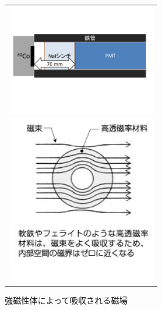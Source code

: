 \begin{figure}[tbp]
  \begin{center}
    \begin{tabular}{c}
      \begin{minipage}[tbp]{0.6\hsize}    
        \begin{center}
          \includegraphics[width=6.5cm]{fig/iguchi/PMTinFe.pdf}
	\caption{鉄管内部図}
	\label{PMTinFe}
     \end{center}
    \end{minipage}
      \begin{minipage}[tbp]{0.4\hsize}    
        \begin{center}
          \includegraphics[width=6.5cm]{fig/iguchi/jibakyusyu.jpg}
         \caption{強磁性体によって吸収される磁場\cite{jibashield}}
	  \label{jibakyusyu}
         \end{center}
        \end{minipage}
     
     \end{tabular}
      \end{center}
   \end{figure}
   
